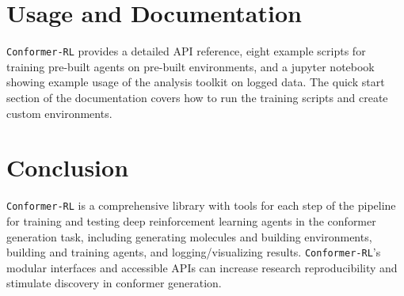 \documentclass[twoside,11pt]{article}
\newcommand{\code}[1]{\texttt{#1}}
\newcommand{\titleofpaper}{Conformer-RL}
\begin{document}
\section{Usage and Documentation}
\code{\titleofpaper} provides a detailed API reference, eight example scripts for training pre-built agents on pre-built environments, and a jupyter notebook showing example usage of the analysis toolkit on logged data. The quick start section of the documentation covers how to run the training scripts and create custom environments.

\section{Conclusion}
\code{\titleofpaper} is a comprehensive library with tools for each step of the pipeline for training and testing deep reinforcement learning agents in the conformer generation task, including generating molecules and building environments, building and training agents, and logging/visualizing results. \code{\titleofpaper}'s modular interfaces and accessible APIs can increase research reproducibility and stimulate discovery in conformer generation.



\newpage


\vskip 0.2in




\newpage

\end{document}
